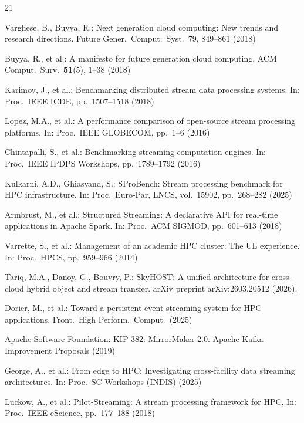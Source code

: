 \documentclass[runningheads]{llncs}
\begin{document}

\begin{thebibliography}{21}

Varghese, B., Buyya, R.: Next generation cloud computing: New trends and research directions. Future Gener.\ Comput.\ Syst.\ 79, 849--861 (2018)

Buyya, R., et al.: A manifesto for future generation cloud computing. ACM Comput.\ Surv.\ \textbf{51}(5), 1--38 (2018)

Karimov, J., et al.: Benchmarking distributed stream data processing systems. In: Proc.\ IEEE ICDE, pp.\ 1507--1518 (2018)

Lopez, M.A., et al.: A performance comparison of open-source stream processing platforms. In: Proc.\ IEEE GLOBECOM, pp.\ 1--6 (2016)

Chintapalli, S., et al.: Benchmarking streaming computation engines. In: Proc.\ IEEE IPDPS Workshops, pp.\ 1789--1792 (2016)

Kulkarni, A.D., Ghiasvand, S.: SProBench: Stream processing benchmark for HPC infrastructure. In: Proc.\ Euro-Par, LNCS, vol.\ 15902, pp.\ 268--282 (2025)


Armbrust, M., et al.: Structured Streaming: A declarative API for real-time applications in Apache Spark. In: Proc.\ ACM SIGMOD, pp.\ 601--613 (2018)

Varrette, S., et al.: Management of an academic HPC cluster: The UL experience. In: Proc.\ HPCS, pp.\ 959--966 (2014)

Tariq, M.A., Danoy, G., Bouvry, P.: SkyHOST: A unified architecture for cross-cloud hybrid object and stream transfer. arXiv preprint arXiv:2603.20512 (2026).


Dorier, M., et al.: Toward a persistent event-streaming system for HPC applications. Front.\ High Perform.\ Comput.\ (2025)

Apache Software Foundation: KIP-382: MirrorMaker 2.0. Apache Kafka Improvement Proposals (2019)

George, A., et al.: From edge to HPC: Investigating cross-facility data streaming architectures. In: Proc.\ SC Workshops (INDIS) (2025)

Luckow, A., et al.: Pilot-Streaming: A stream processing framework for HPC. In: Proc.\ IEEE eScience, pp.\ 177--188 (2018)



\end{thebibliography}
\end{document}
